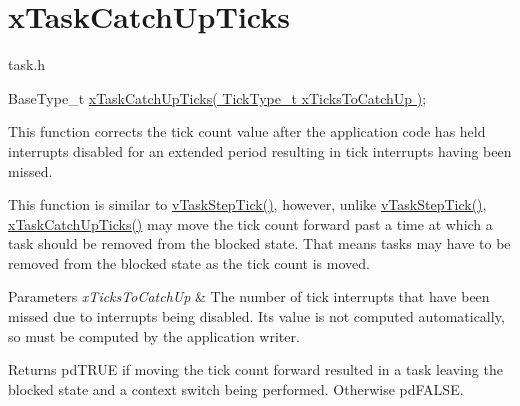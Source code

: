 \hypertarget{group__x_task_catch_up_ticks}{}\section{x\+Task\+Catch\+Up\+Ticks}
\label{group__x_task_catch_up_ticks}
task.\+h 
\begin{DoxyPre}
BaseType\_t \hyperlink{externals_2freertos_2include_2task_8h_a399bcc59c77ed9f1cb2bf3eac55bdf02}{xTaskCatchUpTicks( TickType\_t xTicksToCatchUp )};
\end{DoxyPre}


This function corrects the tick count value after the application code has held interrupts disabled for an extended period resulting in tick interrupts having been missed.

This function is similar to \hyperlink{externals_2freertos_2include_2task_8h_a8dda6cb26bb158dd9636873135e63912}{v\+Task\+Step\+Tick()}, however, unlike \hyperlink{externals_2freertos_2include_2task_8h_a8dda6cb26bb158dd9636873135e63912}{v\+Task\+Step\+Tick()}, \hyperlink{externals_2freertos_2include_2task_8h_a399bcc59c77ed9f1cb2bf3eac55bdf02}{x\+Task\+Catch\+Up\+Ticks()} may move the tick count forward past a time at which a task should be removed from the blocked state. That means tasks may have to be removed from the blocked state as the tick count is moved.


\begin{DoxyParams}{Parameters}
{\em x\+Ticks\+To\+Catch\+Up} & The number of tick interrupts that have been missed due to interrupts being disabled. Its value is not computed automatically, so must be computed by the application writer.\\
\hline
\end{DoxyParams}
\begin{DoxyReturn}{Returns}
pd\+T\+R\+UE if moving the tick count forward resulted in a task leaving the blocked state and a context switch being performed. Otherwise pd\+F\+A\+L\+SE. 
\end{DoxyReturn}
